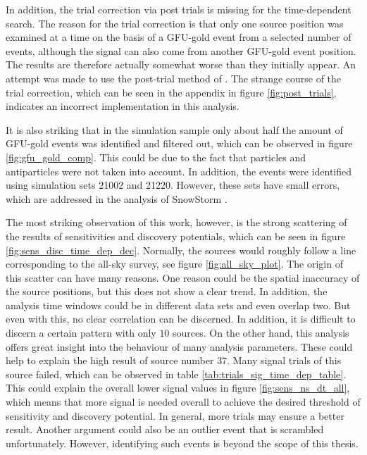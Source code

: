 In addition, the trial correction via post trials is missing for the time-dependent search.
The reason for the trial correction is that only one source position was examined at a time on the basis of a GFU-gold event from a selected number of events, although the signal can also come from another GFU-gold event position.
The results are therefore actually somewhat worse than they initially appear.
An attempt was made to use the post-trial method of \cite{thorben}.
The strange course of the trial correction, which can be seen in the appendix in figure \ref{fig:post_trials}, indicates an incorrect implementation in this analysis.

It is also striking that in the simulation sample only about half the amount of GFU-gold events was identified and filtered out, which can be observed in figure \ref{fig:gfu_gold_comp}.
This could be due to the fact that particles and antiparticles were not taken into account.
In addition, the events were identified using simulation sets 21002 and 21220.
However, these sets have small errors, which are addressed in the analysis of SnowStorm \cite{snowstorm}.

The most striking observation of this work, however, is the strong scattering of the results of sensitivities and discovery potentials, which can be seen in figure \ref{fig:sens_disc_time_dep_dec}.
Normally, the sources would roughly follow a line corresponding to the all-sky survey, see figure \ref{fig:all_sky_plot}.
The origin of this scatter can have many reasons.
One reason could be the spatial inaccuracy of the source positions, but this does not show a clear trend.
In addition, the analysis time windows could be in different data sets and even overlap two.
But even with this, no clear correlation can be discerned.
In addition, it is difficult to discern a certain pattern with only $\num{10}$ sources.
On the other hand, this analysis offers great insight into the behaviour of many analysis parameters.
These could help to explain the high result of source number $\num{37}$.
Many signal trials of this source failed, which can be observed in table \ref{tab:trials_sig_time_dep_table}.
This could explain the overall lower signal values in figure \ref{fig:sens_ns_dt_all}, which means that more signal is needed overall to achieve the desired threshold of sensitivity and discovery potential.
In general, more trials may ensure a better result.
Another argument could also be an outlier event that is scrambled unfortunately.
However, identifying such events is beyond the scope of this thesis.

